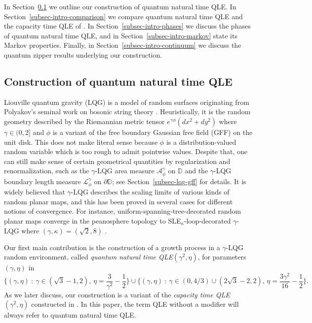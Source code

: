 \documentclass[a4paper]{article}
\numberwithin{equation}{section}
\newcommand{\eqb}{\begin{equation}}
\newcommand{\eqe}{\end{equation}}
\newcommand{\D}{\mathbb{D}}
\newcommand{\cA}{\mathcal{A}}
\newcommand{\cL}{\mathcal{L}}
\theoremstyle{remark}
\numberwithin{equation}{section}
\begin{document}
In Section~\ref{subsec-intro-construction} we outline our construction of quantum natural time QLE. In Section~\ref{subsec-intro-comparison} we compare quantum natural time QLE and the capacity time QLE of \cite{ms-qle}. In Section~\ref{subsec-intro-phases} we discuss the phases of quantum natural time QLE, and in Section~\ref{subsec-intro-markov} state its Markov properties. Finally, in Section~\ref{subsec-intro-continuum} we discuss the quantum zipper results underlying our construction.

\subsection{Construction of quantum natural time QLE}\label{subsec-intro-construction}
Liouville quantum gravity (LQG) is a model of random surfaces originating from Polyakov's seminal work on bosonic string theory \cite{polyakov-qg1}. Heuristically, it is the random geometry described by the Riemannian metric tensor $e^{\gamma \phi} (dx^2 + dy^2)$ where $\gamma \in (0,2]$ and $\phi$ is a variant of the free boundary Gaussian free field (GFF) on the unit disk. This does not make literal sense because $\phi$ is a distribution-valued random variable which is too rough to admit pointwise values. Despite that, one can still make sense of certain geometrical quantities by regularization and renormalization, such as the $\gamma$-LQG area measure $\cA^\gamma_\phi$ on $\D$ and the $\gamma$-LQG boundary length measure $\cL^\gamma_\phi$ on $\partial \D$; see Section~\ref{subsec-lqg-gff} for details. 
It is widely believed that $\gamma$-LQG describes the scaling limits of various kinds of random planar maps, and this has been proved in several cases for different notions of convergence. For instance, uniform-spanning-tree-decorated random planar maps converge in the peanosphere topology to SLE$_\kappa$-loop-decorated $\gamma$-LQG where $(\gamma, \kappa) = (\sqrt2, 8)$ \cite{mullin-maps, shef-burger, DMS14}.


Our first main contribution is the construction of a growth process in a $\gamma$-LQG random environment, called \emph{quantum natural time QLE$(\gamma^2, \eta)$}, for parameters $(\gamma, \eta)$ in 
\eqb\label{eq-gamma-eta}
\{(\gamma, \eta) \: : \: \gamma \in (\sqrt3 -1 , 2), \, \eta = \frac{3}{\gamma^2} - \frac12\} \cup \{(\gamma, \eta) \: : \: \gamma \in (0, 4/3) \cup (2\sqrt3 - 2, 2), \, \eta = \frac{3\gamma^2}{16} - \frac12\}.
\eqe
As we later discuss, our construction is a variant of the \emph{capacity time QLE$(\gamma^2, \eta)$} constructed in \cite{ms-qle}. In this paper, the term QLE without a modifier will always refer to quantum natural time QLE.
\end{document}
